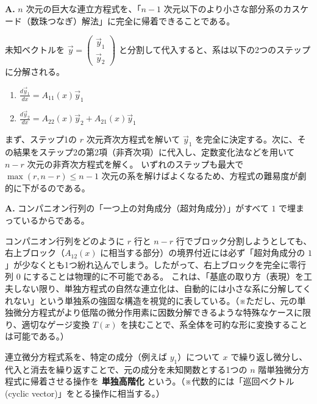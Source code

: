 \begin{Q}
\textbf{A.} $n$ 次元の巨大な連立方程式を、「$n-1$ 次元以下のより小さな部分系のカスケード（数珠つなぎ）解法」に完全に帰着できることである。

未知ベクトルを $\vec{y} = \begin{pmatrix} \vec{y}_{1} \\ \vec{y}_{2} \end{pmatrix}$ と分割して代入すると、系は以下の2つのステップに分解される。
\begin{enumerate}
    \item $\frac{d\vec{y}_{1}}{dx} = A_{11}(x)\vec{y}_{1}$
    \item $\frac{d\vec{y}_{2}}{dx} = A_{22}(x)\vec{y}_{2} + A_{21}(x)\vec{y}_{1}$
\end{enumerate}
まず、ステップ1の $r$ 次元斉次方程式を解いて $\vec{y}_{1}$ を完全に決定する。次に、その結果をステップ2の第2項（非斉次項）に代入し、定数変化法などを用いて $n-r$ 次元の非斉次方程式を解く。
いずれのステップも最大で $\max(r, n-r) \le n-1$ 次元の系を解けばよくなるため、方程式の難易度が劇的に下がるのである。
\end{Q}

\begin{Q}
\textbf{A.} コンパニオン行列の「一つ上の対角成分（超対角成分）」がすべて $1$ で埋まっているからである。

コンパニオン行列をどのように $r$ 行と $n-r$ 行でブロック分割しようとしても、右上ブロック（$A_{12}(x)$ に相当する部分）の境界付近には必ず「超対角成分の $1$」が少なくとも1つ紛れ込んでしまう。したがって、右上ブロックを完全に零行列 $0$ にすることは物理的に不可能である。
これは、「基底の取り方（表現）を工夫しない限り、単独方程式の自然な連立化は、自動的には小さな系に分解してくれない」という単独系の強固な構造を視覚的に表している。（※ただし、元の単独微分方程式がより低階の微分作用素に因数分解できるような特殊なケースに限り、適切なゲージ変換 $T(x)$ を挟むことで、系全体を可約な形に変換することは可能である。）
\end{Q}
\begin{definition}[単独高階化]
    連立微分方程式系を、特定の成分（例えば $y_1$）について $x$ で繰り返し微分し、代入と消去を繰り返すことで、元の成分を未知関数とする1つの $n$ 階単独微分方程式に帰着させる操作を \textbf{単独高階化} という。（※代数的には「巡回ベクトル (cyclic vector)」をとる操作に相当する。）
\end{definition}

